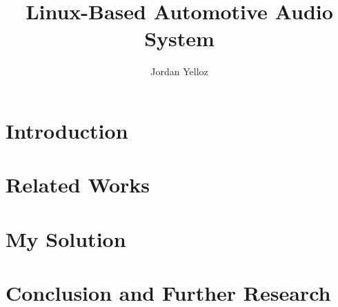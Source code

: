 \documentclass[project,12pt,lof]{CSUNthesis}
\title{Linux-Based Automotive Audio System}
\author{Jordan Yelloz}
\begin{document}

\setlength{\baselineskip}{24pt}

\chapter{Introduction}



\chapter{Related Works}



\chapter{My Solution}



\chapter{Conclusion and Further Research}


\end{document}
